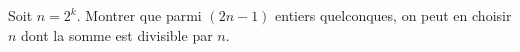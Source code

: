 Soit $n = 2^k$. Montrer que parmi $(2n - 1)$ entiers quelconques, on peut en choisir $n$ dont la somme est divisible par $n$.
